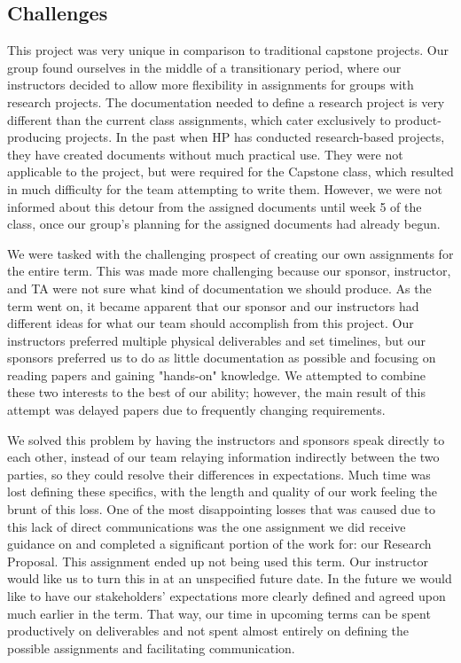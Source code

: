 \documentclass[onecolumn, draftclsnofoot,10pt, compsoc]{IEEEtran}
\begin{document}
\subsection{Challenges}
This project was very unique in comparison to traditional capstone projects.
Our group found ourselves in the middle of a transitionary period, where our instructors decided to allow more flexibility in assignments for groups with research projects. 
The documentation needed to define a research project is very different than the current class assignments, which cater exclusively to product-producing projects. 
In the past when HP has conducted research-based projects, they have created documents without much practical use.
They were not applicable to the project, but were required for the Capstone class, which resulted in much difficulty for the team attempting to write them.
However, we were not informed about this detour from the assigned documents until week 5 of the class, once our group's planning for the assigned documents had already begun. 

We were tasked with the challenging prospect of creating our own assignments for the entire term.
This was made more challenging because our sponsor, instructor, and TA were not sure what kind of documentation we should produce.
As the term went on, it became apparent that our sponsor and our instructors had different ideas for what our team should accomplish from this project. 
Our instructors preferred multiple physical deliverables and set timelines, but our sponsors preferred us to do as little documentation as possible and focusing on reading papers and gaining "hands-on" knowledge.
We attempted to combine these two interests to the best of our ability; however, the main result of this attempt was delayed papers due to frequently changing requirements. 

We solved this problem by having the instructors and sponsors speak directly to each other, instead of our team relaying information indirectly between the two parties, so they could resolve their differences in expectations.
Much time was lost defining these specifics, with the length and quality of our work feeling the brunt of this loss.
One of the most disappointing losses that was caused due to this lack of direct communications was the one assignment we did receive guidance on and completed a significant portion of the work for: our Research Proposal.
This assignment ended up not being used this term. 
Our instructor would like us to turn this in at an unspecified future date.
In the future we would like to have our stakeholders' expectations more clearly defined and agreed upon much earlier in the term.
That way, our time in upcoming terms can be spent productively on deliverables and not spent almost entirely on defining the possible assignments and facilitating communication. 
\end{document}
